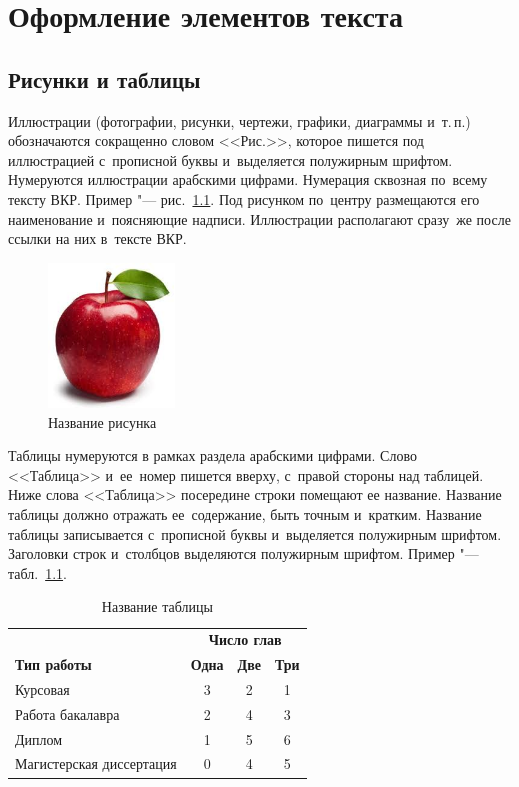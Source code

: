 \documentclass[a4paper,12pt]{diplom}
\begin{document}
\chapter{Оформление элементов текста}

\section{Рисунки и таблицы}
Иллюстрации (фотографии, рисунки, чертежи, графики, диаграммы и~т.\,п.) обозначаются сокращенно словом <<Рис.>>, которое пишется под иллюстрацией  с~прописной буквы и~выделяется полужирным шрифтом. Нумеруются иллюстрации арабскими цифрами. Нумерация сквозная по~всему тексту ВКР. Пример "--- рис.~\ref{fig:1}.
Под рисунком по~центру размещаются его наименование и~поясняющие надписи. 
Иллюстрации располагают сразу~же после ссылки на них в~тексте ВКР. 

\begin{figure}[!ht]
	\centering
	\includegraphics[width=0.3\textwidth]{apple.jpg}
	\caption{Название рисунка}
	\label{fig:1} %
\end{figure}

Таблицы нумеруются в рамках раздела  арабскими цифрами. Слово <<Таблица>> и~ее~номер пишется вверху, с~правой стороны над таблицей.
Ниже слова <<Таблица>>  посередине строки помещают ее название. Название  таблицы должно отражать ее~содержание, быть точным и~кратким. Название таблицы записывается с~прописной буквы и~выделяется полужирным шрифтом. Заголовки строк и~столбцов выделяются полужирным шрифтом.
Пример "--- табл.~\ref{tab:1}.

\begin{table}[tbh]
	\caption{Название таблицы}
	\label{tab:1} %
	\centering
	\begin{tabular}{lccc}
		\toprule
		& \multicolumn{3}{c}{\textbf{Число глав}}\\
		\cmidrule(l){2-4}
		\textbf{Тип работы} & \textbf{Одна} & \textbf{Две} & \textbf{Три} \\
		\midrule 
		Курсовая & 3 & 2 & 1 \\
		Работа бакалавра & 2 & 4 & 3 \\
		Диплом & 1 & 5 & 6 \\
		Магистерская диссертация & 0 & 4 & 5 \\
		\bottomrule
	\end{tabular}
\end{table}
\end{document}
